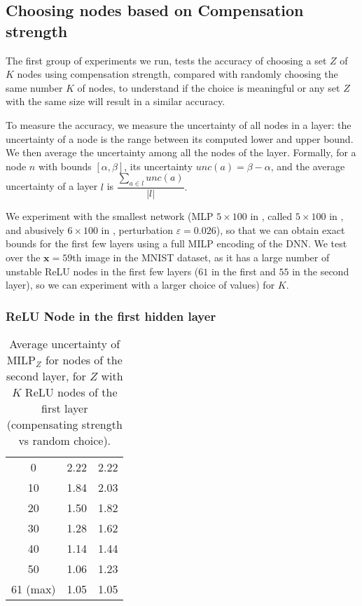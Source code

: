\documentclass{llncs}
\newcommand{\vx}{\boldsymbol{x}}
\newcommand{\MILP}{{\textrm{MILP}}}
\begin{document}
\subsection{Choosing nodes based on Compensation strength}

The first group of experiments we run, tests the accuracy of choosing a set $Z$ of $K$ nodes using compensation strength, compared with randomly choosing the same number $K$ of nodes,  to understand if the choice is meaningful or any set $Z$ with the same size will result in a similar accuracy.

To measure the accuracy, we measure the uncertainty of all nodes in a layer:
the uncertainty of a node is the range between its computed lower and upper bound. 
We then average the uncertainty among all the nodes of the layer.
Formally, for a node $n$ with bounds $[\alpha,\beta]$, its uncertainty $unc(a) = \beta - \alpha$, and the average uncertainty of a layer $l$ is $\dfrac{\sum_{a\in l} unc(a)}{|l|}.$

We experiment with the smallest network (MLP $5\times 100$ in \cite{crown}, 
called $5 \times 100$ in \cite{prima}, and abusively $6 \times 100$ in \cite{deeppoly}, perturbation $\varepsilon=0.026$), so that we can obtain exact bounds for the first few layers using a full MILP encoding of the DNN. We test over the $\vx=59$th image in the MNIST dataset, as it has a large number of unstable ReLU nodes in the first few layers ($61$ in the first and $55$ in the second layer), so we can experiment with a larger choice of values) for $K$.

\subsubsection*{ReLU Node in the first hidden layer}


\begin{table}[b!]
	\centering
	\begin{tabular}{|c||c|c|}
	\hline
	\text{Number $K$ of nodes in $Z$}  &  \text{Compensate strength} & \text{Random Choice}  \\ \hline
	\hline
	0  &  2.22 & 2.22  \\ \hline
	10  &  1.84 & 2.03  \\ \hline
	20  &  1.50 & 1.82  \\ \hline
	30  &  1.28 & 1.62  \\ \hline
	40  &  1.14 & 1.44  \\ \hline
	50  &  1.06 & 1.23  \\ \hline
	61 (max) & 1.05 &  1.05 \\ \hline
\end{tabular}
\caption{Average uncertainty of $\MILP_Z$ for nodes of the second layer, for $Z$ with $K$ ReLU nodes of the first layer (compensating strength vs random choice).}
\label{tab:example0}
\end{table}
\end{document}
